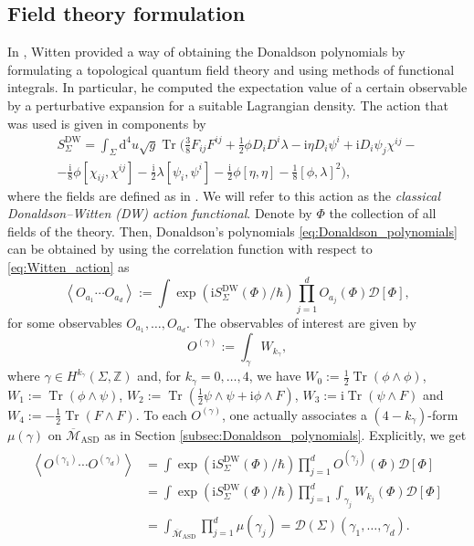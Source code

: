 \documentclass[11pt,colorinlistoftodos]{amsart}
\numberwithin{equation}{subsection}
\theoremstyle{plain}
\theoremstyle{definition}
\theoremstyle{remark}
\newcommand{\Z}{\mathbb{Z}}
\newcommand{\dd}{{\mathrm{d}}}
\DeclareMathOperator{\tr}{Tr}
\newcommand{\calM}{\mathcal{M}}
\newcommand{\I}{\mathrm{i}}
\begin{document}
\subsection{Field theory formulation}
\label{subsec:field_theory_formulation}
In \cite{Witten1988}, Witten provided a way of obtaining the Donaldson polynomials by formulating a topological quantum field theory and using methods of functional integrals. In particular, he computed the expectation value of a certain observable by a perturbative expansion for a suitable Lagrangian density.
The action that was used is given in components by 
\begin{multline}
    \label{eq:Witten_action}
    S^\mathrm{DW}_\Sigma=\int_\Sigma\dd^4u\sqrt{g}\tr\bigg(\frac{3}{8}F_{ij}F^{ij}+\frac{1}{2}\phi D_iD^i\lambda-\I\eta D_i\psi^i+\I D_i\psi_j\chi^{ij}-\\-\frac{\I}{8}\phi[\chi_{ij},\chi^{ij}]-\frac{\I}{2}\lambda[\psi_i,\psi^i]-\frac{\I}{2}\phi[\eta,\eta]-\frac{1}{8}[\phi,\lambda]^2\bigg),
\end{multline}
where the fields are defined as in \cite{Witten1988}. We will refer to this action as the \emph{classical Donaldson--Witten (DW) action functional}. 
Denote by $\Phi$ the collection of all fields of the theory. Then, Donaldson's polynomials \eqref{eq:Donaldson_polynomials} can be obtained by using the correlation function with respect to \eqref{eq:Witten_action} as
\[
\left\langle O_{a_1}\dotsm O_{a_d}\right\rangle:=\int \exp(\I S^\mathrm{DW}_\Sigma(\Phi)/\hbar)\prod_{j=1}^dO_{a_j}(\Phi)\mathscr{D}[\Phi],
\]
for some observables $O_{a_1},\ldots, O_{a_d}$. The observables of interest are given by 
\begin{equation}
    \label{eq:Witten_observables}
    O^{(\gamma)}:=\int_\gamma W_{k_\gamma},
\end{equation}
where $\gamma\in H^{k_\gamma}(\Sigma,\Z)$ and, for $k_\gamma=0,\ldots, 4$, we have $W_0:=\frac{1}{2}\tr(\phi\land \phi)$, $W_1:=\tr(\phi\land \psi)$, $W_2:=\tr(\frac{1}{2}\psi\land\psi+\I\phi\land F)$, $W_3:=\I\tr(\psi\land F)$ and $W_4:=-\frac{1}{2}\tr(F\land F)$. To each $O^{(\gamma)}$, one actually associates a $(4-k_\gamma)$-form $\mu(\gamma)$ on $\overline{\calM}_\mathrm{ASD}$ as in Section \ref{subsec:Donaldson_polynomials}. Explicitly, we get 
\begin{align}
    \label{eq:correlation_function}
    \begin{split}
    \left\langle O^{(\gamma_1)}\dotsm O^{(\gamma_d)}\right\rangle&=\int \exp(\I S^\mathrm{DW}_\Sigma(\Phi)/\hbar)\prod_{j=1}^dO^{(\gamma_j)}(\Phi)\mathscr{D}[\Phi]\\
    &=\int \exp(\I S^\mathrm{DW}_\Sigma(\Phi)/\hbar)\prod_{j=1}^d\int_{\gamma_j}W_{k_j}(\Phi)\mathscr{D}[\Phi]\\
    &=\int_{\overline{\calM}_\mathrm{ASD}}\prod_{j=1}^d\mu(\gamma_j)=\mathcal{D}(\Sigma)(\gamma_1,\ldots,\gamma_d).
    \end{split}
\end{align}
\end{document}
